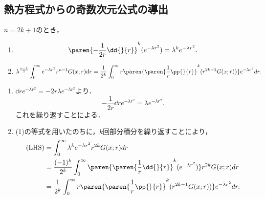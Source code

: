 \documentclass[uplatex,dvipdfmx]{jsreport}
\begin{document}
\subsection{熱方程式からの奇数次元公式の導出}

\begin{lemma}
    $n=2k+1$のとき，
    \begin{enumerate}
        \item \[\paren{-\frac{1}{2r}\dd{}{r}}^k(e^{-\lambda r^2})=\lambda^ke^{-\lambda r^2}.\]
        \item \[\lambda^{\frac{n-1}{2}}\int^\infty_0e^{-\lambda r^2}r^{n-1}G(x;r)dr=\frac{1}{2^k}\int^\infty_0r\paren{\paren{\frac{1}{r}\pp{}{r}}^k(r^{2k-1}G(x;r))}e^{-\lambda r^2}dr.\]
    \end{enumerate}
\end{lemma}
\begin{Proof}\mbox{}
    \begin{enumerate}
        \item $\dd{}{r}e^{-\lambda r^2}=-2r\lambda e^{-\lambda r^2}$より．
        \[-\frac{1}{2r}\dd{}{r}e^{-\lambda r^2}=\lambda e^{-\lambda r^2}.\]
        これを繰り返すことによる．
        \item (1)の等式を用いたのちに，$k$回部分積分を繰り返すことにより，
        \begin{align*}
            \text{(LHS)}&=\int^\infty_0\lambda^ke^{-\lambda r^2}r^{2k}G(x;r)dr\\
            &=\frac{(-1)^k}{2^k}\int^\infty_0\paren{\paren{\frac{1}{r}\dd{}{r}}^k(e^{-\lambda r^2})}r^{2k}G(x;r)dr\\
            &=\frac{1}{2^k}\int^\infty_0r\paren{\paren{\frac{1}{r}\pp{}{r}}^k(r^{2k-1}G(x;r))}e^{-\lambda r^2}dr.
        \end{align*}
    \end{enumerate}
\end{Proof}
\end{document}
